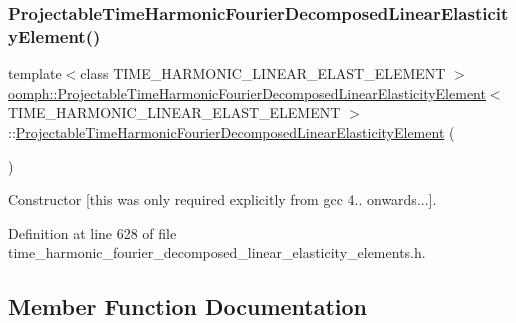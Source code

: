 \subsubsection{\texorpdfstring{Projectable\+Time\+Harmonic\+Fourier\+Decomposed\+Linear\+Elasticity\+Element()}{ProjectableTimeHarmonicFourierDecomposedLinearElasticityElement()}}
{\footnotesize\ttfamily template$<$class T\+I\+M\+E\+\_\+\+H\+A\+R\+M\+O\+N\+I\+C\+\_\+\+L\+I\+N\+E\+A\+R\+\_\+\+E\+L\+A\+S\+T\+\_\+\+E\+L\+E\+M\+E\+NT $>$ \\
\hyperlink{classoomph_1_1ProjectableTimeHarmonicFourierDecomposedLinearElasticityElement}{oomph\+::\+Projectable\+Time\+Harmonic\+Fourier\+Decomposed\+Linear\+Elasticity\+Element}$<$ T\+I\+M\+E\+\_\+\+H\+A\+R\+M\+O\+N\+I\+C\+\_\+\+L\+I\+N\+E\+A\+R\+\_\+\+E\+L\+A\+S\+T\+\_\+\+E\+L\+E\+M\+E\+NT $>$\+::\hyperlink{classoomph_1_1ProjectableTimeHarmonicFourierDecomposedLinearElasticityElement}{Projectable\+Time\+Harmonic\+Fourier\+Decomposed\+Linear\+Elasticity\+Element} (\begin{DoxyParamCaption}{ }\end{DoxyParamCaption})\hspace{0.3cm}{\ttfamily [inline]}}



Constructor \mbox{[}this was only required explicitly from gcc 4.. onwards...\mbox{]}. 



Definition at line 628 of file time\+\_\+harmonic\+\_\+fourier\+\_\+decomposed\+\_\+linear\+\_\+elasticity\+\_\+elements.\+h.



\subsection{Member Function Documentation}
\mbox{\label{classoomph_1_1ProjectableTimeHarmonicFourierDecomposedLinearElasticityElement_a4fcccf713843eda6d6cab9c73950d0d1}} 
